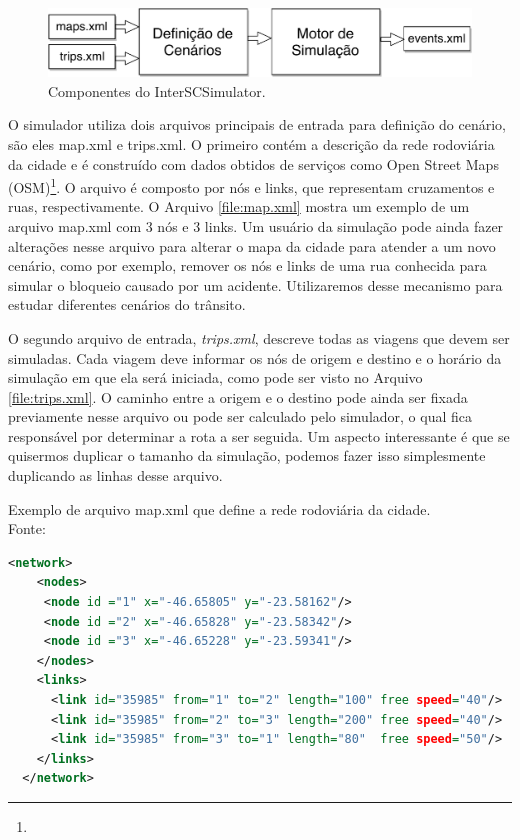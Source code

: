 {\begin{figure}[!htb]
  \centering
  \includegraphics[width=\textwidth]{../figuras/arquitetura-simulador.pdf}
  \caption[Componentes do InterSCSimulator]{Componentes do InterSCSimulator. \label{fig:interscsimulator}}
\end{figure}

  O simulador utiliza dois arquivos principais de entrada para definição do
cenário, são eles map.xml e trips.xml. O primeiro contém a descrição da rede
rodoviária da cidade e é construído com dados obtidos de serviços como Open
Street Maps (OSM)\footnote{}. O arquivo é composto por
nós e links, que representam cruzamentos e ruas, respectivamente. O Arquivo
\ref{file:map.xml} mostra um exemplo de um arquivo map.xml com 3 nós e 3 links. Um
usuário da simulação pode ainda fazer alterações nesse arquivo para alterar o
mapa da cidade para atender a um novo cenário, como por exemplo, remover os nós
e links de uma rua conhecida para simular o bloqueio causado por um acidente.
Utilizaremos desse mecanismo para estudar diferentes cenários do trânsito.

  O segundo arquivo de entrada, \emph{trips.xml}, descreve todas as viagens que
devem ser simuladas. Cada viagem deve informar os nós de origem e destino e o
horário da simulação em que ela será iniciada, como pode ser visto no Arquivo
\ref{file:trips.xml}. O caminho entre a origem e o destino pode ainda ser fixada
previamente nesse arquivo ou pode ser calculado pelo simulador, o qual fica
responsável por determinar a rota a ser seguida. Um aspecto interessante é que
se quisermos duplicar o tamanho da simulação, podemos fazer isso simplesmente
duplicando as linhas desse arquivo.

\begin{programruledcaption}{Exemplo de arquivo map.xml que define a rede rodoviária da cidade. \\Fonte: \citet{mabs2017} \label{file:map.xml}}
  \begin{lstlisting}[language=XML]
  <network>
    <nodes>
     <node id ="1" x="-46.65805" y="-23.58162"/>
     <node id ="2" x="-46.65828" y="-23.58342"/>
     <node id ="3" x="-46.65228" y="-23.59341"/>
    </nodes>
    <links>
      <link id="35985" from="1" to="2" length="100" free speed="40"/>
      <link id="35985" from="2" to="3" length="200" free speed="40"/>
      <link id="35985" from="3" to="1" length="80"  free speed="50"/>
    </links>
  </network>
  \end{lstlisting}
\end{programruledcaption}


}
